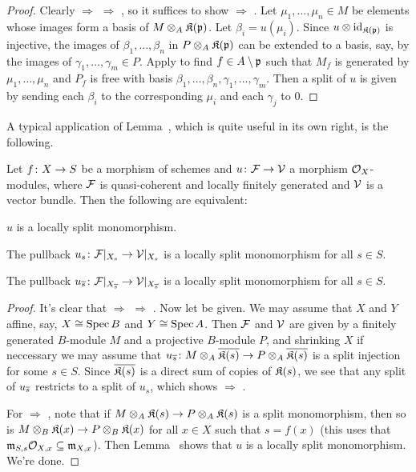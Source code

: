 \documentclass[a4paper,parskip=half,numbers=enddot, DIV=12]{scrreprt}
\begin{document}
\begin{proof}
	Clearly  $\Rightarrow$  $\Rightarrow$ , so it suffices to show  $\Rightarrow$ . Let $\mu_1,\ldots,\mu_n\in M$ be elements whose images form a basis of $M\otimes_A\mathfrak{K}(\mathfrak{p})$. Let $\beta_i=u(\mu_i)$. Since $u\otimes\operatorname{id}_{\mathfrak{K}(\mathfrak{p})}$ is injective, the images of $\beta_1,\ldots,\beta_n$ in $P\otimes_A\mathfrak{K}(\mathfrak{p})$ can be extended to a basis, say, by the images of $\gamma_1,\ldots,\gamma_m\in P$. Apply \cite[Lemma~1.5.1]{alg2} to find $f\in A\setminus \mathfrak{p}$ such that $M_f$ is generated by $\mu_1,\ldots,\mu_n$ and $P_f$ is free with basis $\beta_1,\ldots,\beta_n,\gamma_1,\ldots,\gamma_m$. Then a split of $u$ is given by sending each $\beta_i$ to the corresponding $\mu_i$ and each $\gamma_j$ to $0$.
\end{proof}
A typical application of Lemma~, which is quite useful in its own right, is the following.
\begin{cor}
	Let $f\colon X\morphism S$ be a morphism of schemes and $u\colon \Ff\morphism\Vv$ a morphism $\mathcal{O}_X$-modules, where $\mathcal{F}$ is quasi-coherent and locally finitely generated and $\mathcal{V}$ is a vector bundle. Then the following are equivalent:
	\begin{alphanumerate}
		\item $u$ is a locally split monomorphism.
		\item The pullback $u_s\colon \Ff|_{X_s}\morphism \Vv|_{X_s}$ is a locally split monomorphism for all $s\in S$.
		\item The pullback $u_{\ov{s}}\colon \Ff|_{X_{\ov{s}}}\morphism \Vv|_{X_{\ov{s}}}$ is a locally split monomorphism for all $s\in S$.
	\end{alphanumerate}
\end{cor}
\begin{proof}
	It's clear that  $\Rightarrow$  $\Rightarrow$ . Now let  be given. We may assume that $X$ and $Y$ affine, say, $X\cong \operatorname{Spec} B$ and $Y\cong \operatorname{Spec} A$. Then $\mathcal{F}$ and $\mathcal{V}$ are given by a finitely generated $B$-module $M$ and a projective $B$-module $P$, and shrinking $X$ if neccessary we may assume that $u_{\ov{s}}\colon M\otimes_A\ov{\KK(s)}\morphism P\otimes_A\ov{\KK(s)}$ is a split injection for some $s\in S$. Since $\overline{\mathfrak{K}(s)}$ is a direct sum of copies of $\mathfrak{K}(s)$, we see that any split of $u_{\overline{s}}$ restricts to a split of $u_s$, which shows  $\Rightarrow$ .
	
	For  $\Rightarrow$ , note that if $M\otimes_A\KK(s)\morphism P\otimes_A\KK(s)$ is a split monomorphism, then so is $M\otimes_B\KK(x)\morphism P\otimes_B\KK(x)$ for all $x\in X$ such that $s=f(x)$ (this uses that $\mathfrak{m}_{S,s}\mathcal{O}_{X,x}\subseteq \mathfrak{m}_{X,x}$). Then Lemma~ shows that $u$ is a locally split monomorphism. We're done.
\end{proof}
\end{document}

